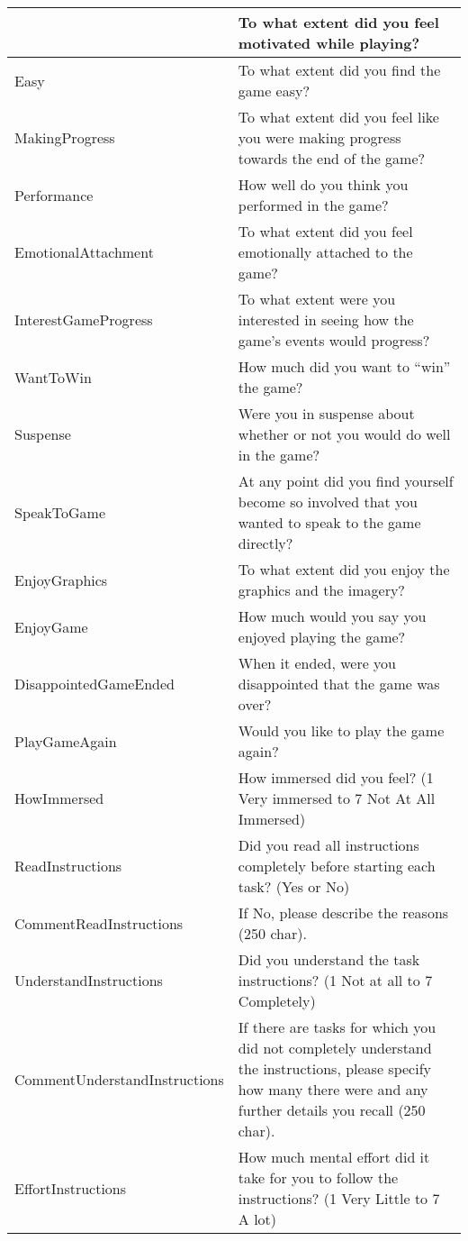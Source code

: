 \documentclass[letterpaper,10pt,english]{sphinxmanual}
\begin{document}
\begin{savenotes}
\begin{longtable}{|l|l|}
&
To what extent did you feel motivated while playing?
\\
\hline
Easy
&
To what extent did you find the game easy?
\\
\hline
MakingProgress
&
To what extent did you feel like you were making progress towards the end of the game?
\\
\hline
Performance
&
How well do you think you performed in the game?
\\
\hline
EmotionalAttachment
&
To what extent did you feel emotionally attached to the game?
\\
\hline
InterestGameProgress
&
To what extent were you interested in seeing how the game’s events would progress?
\\
\hline
WantToWin
&
How much did you want to “win” the game?
\\
\hline
Suspense
&
Were you in suspense about whether or not you would do well in the game?
\\
\hline
SpeakToGame
&
At any point did you find yourself become so involved that you wanted to speak to the game directly?
\\
\hline
EnjoyGraphics
&
To what extent did you enjoy the graphics and the imagery?
\\
\hline
EnjoyGame
&
How much would you say you enjoyed playing the game?
\\
\hline
DisappointedGameEnded
&
When it ended, were you disappointed that the game was over?
\\
\hline
PlayGameAgain
&
Would you like to play the game again?
\\
\hline
HowImmersed
&
How immersed did you feel? (1 \textendash{} Very immersed to 7 \textendash{} Not At All Immersed)
\\
\hline
ReadInstructions
&
Did you read all instructions completely before starting each task? (Yes or No)
\\
\hline
CommentReadInstructions
&
If No, please describe the reasons (250 char).
\\
\hline
UnderstandInstructions
&
Did you understand the task instructions? (1 \textendash{} Not at all to 7 \textendash{} Completely)
\\
\hline
CommentUnderstandInstructions
&
If there are tasks for which you did not completely understand the instructions, please specify how many there were and any further details you recall (250 char).
\\
\hline
EffortInstructions
&
How much mental effort did it take for you to follow the instructions? (1 \textendash{} Very Little to 7 \textendash{} A lot)
\\
\hline
\end{longtable}\sphinxatlongtableend\end{savenotes}
\end{document}
